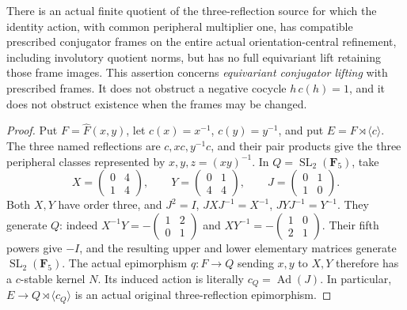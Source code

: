 There is an actual finite quotient of the three-reflection source for
which the identity action, with common peripheral multiplier one, has
compatible prescribed conjugator frames on the entire actual
orientation-central refinement, including involutory quotient norms,
but has no full equivariant lift retaining those frame images.
This assertion concerns \emph{equivariant conjugator lifting} with
prescribed frames. It does not obstruct a negative cocycle
\(h\,c(h)=1\), and it does not obstruct existence when the frames
may be changed.

\begin{proof}
Put \(F=\widehat F(x,y)\), let \(c(x)=x^{-1}\),
\(c(y)=y^{-1}\), and put
\(E=F\rtimes\langle c\rangle\).
The three named reflections are \(c,xc,y^{-1}c\), and their
pair products give the three peripheral classes represented by
\(x,y,z=(xy)^{-1}\). In \(Q=\operatorname{SL}_2(\mathbf F_5)\),
take
\[
 X=\begin{pmatrix}0&4\\1&4\end{pmatrix},\qquad
 Y=\begin{pmatrix}0&1\\4&4\end{pmatrix},\qquad
 J=\begin{pmatrix}0&1\\1&0\end{pmatrix}.
 \tag{A.74.1}
\]
Both \(X,Y\) have order three, and
\(J^2=I\), \(JXJ^{-1}=X^{-1}\),
\(JYJ^{-1}=Y^{-1}\). They generate \(Q\): indeed
\(X^{-1}Y=-\left(\begin{smallmatrix}1&2\\0&1\end{smallmatrix}\right)\)
and
\(XY^{-1}=-\left(\begin{smallmatrix}1&0\\2&1\end{smallmatrix}\right)\).
Their fifth powers give \(-I\), and the resulting upper and lower
elementary matrices generate \(\operatorname{SL}_2(\mathbf F_5)\).
The actual epimorphism \(q:F\to Q\) sending \(x,y\) to \(X,Y\)
therefore has a \(c\)-stable kernel \(N\). Its induced action is
literally \(c_Q=\operatorname{Ad}(J)\). In particular,
\(E\to Q\rtimes\langle c_Q\rangle\) is an actual original
three-reflection epimorphism.


\end{proof}
